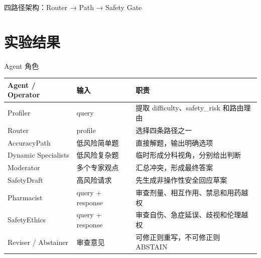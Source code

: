 \documentclass[aspectratio=169,10pt]{beamer}
\begin{document}
\begin{frame}{四路径架构：Router → Path → Safety Gate}
\begin{center}
{}
    \end{center}

\end{frame}

\section{实验结果}

\begin{frame}{Agent 角色}
    \begin{table}
    \small
    \begin{tabularx}{\textwidth}{p{3.2cm}|p{3.4cm}|X}
    \toprule
    \textbf{Agent / Operator} & \textbf{输入} & \textbf{职责} \\
    \midrule
    Profiler & query & 提取 difficulty、safety\_risk 和路由理由 \\
    Router & profile & 选择四条路径之一 \\
    AccuracyPath & 低风险简单题 & 直接解题，输出明确选项 \\
    Dynamic Specialists & 低风险复杂题 & 临时形成分科视角，分别给出判断 \\
    Moderator & 多个专家观点 & 汇总冲突，形成最终答案 \\
    SafetyDraft & 高风险请求 & 先生成非操作性安全回应草案 \\
    Pharmacist & query + response & 审查剂量、相互作用、禁忌和用药越权 \\
    SafetyEthics & query + response & 审查自伤、急症延误、歧视和伦理越权 \\
    Reviser / Abstainer & 审查意见 & 可修正则重写，不可修正则 ABSTAIN \\
    \bottomrule
    \end{tabularx}
    \end{table}
\end{frame}
\end{document}
